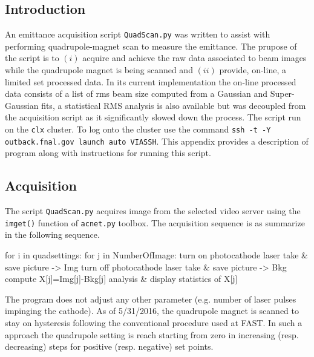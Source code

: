 \documentclass[notitlepage,twocolumn,nofootinbib,showpacs,preprintnumbers,superscriptaddress,amsmath,amssymb]{revtex4-1}
\begin{document}
\subsection{Introduction}
An emittance acquisition script {\tt QuadScan.py} was written to assist with performing quadrupole-magnet scan to measure the emittance. The prupose of the script is to $(i)$ acquire and achieve the raw data associated to beam images while the quadrupole magnet is being scanned and $(ii)$ provide, on-line, a limited set processed data. In its current implementation the on-line processed data consists of a list of rms beam size computed from a Gaussian and Super-Gaussian fits, a statistical RMS analysis is also available but was decoupled from the acquisition script as it significantly slowed down the process. The script run on the {\tt clx} cluster. To log onto the cluster use the command {\tt ssh -t -Y outback.fnal.gov launch auto VIASSH}. This appendix provides a description of program along with instructions for running this script.
%
\subsection{Acquisition}
The script {\tt QuadScan.py} acquires image from the selected video server using the {\tt imget()} function of {\tt acnet.py} toolbox. The acquisition sequence is as summarize in the following sequence.

\begin{python}
for i in quadsettings:
   for j in NumberOfImage:
      turn on photocathode laser 
      take & save picture -> Img
      turn off photocathode laser
      take & save picture -> Bkg
   compute X[j]=Img[j]-Bkg[j]
   analysis & display statistics of X[j]
\end{python}
The program does not adjust any other parameter (e.g. number of laser pulses impinging the cathode). As of 5/31/2016, 
the quadrupole magnet is scanned to stay on hysteresis following the conventional procedure used at FAST. In such a 
approach the quadrupole setting is reach starting from zero in increasing (resp. decreasing) steps for positive (resp. negative) 
set points. 
\end{document}
